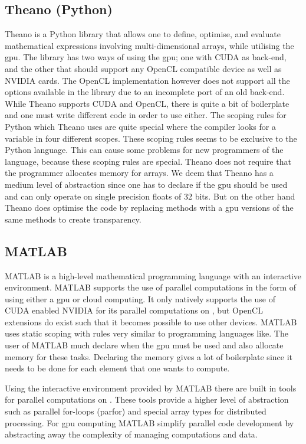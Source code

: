 \subsection{Theano (Python)}
Theano is a Python library that allows one to define, optimise, and evaluate mathematical expressions involving multi-dimensional arrays, while utilising the \acrshort{gpu}.
The library has two ways of using the \acrshort{gpu}; one with CUDA as back-end, and the other that should support any OpenCL compatible device as well as NVIDIA cards.
The OpenCL implementation however does not support all the options available in the library due to an incomplete port of an old back-end.
While Theano supports CUDA and OpenCL, there is quite a bit of boilerplate and one must write different code in order to use either.	
The scoping rules for Python which Theano uses are quite special where the compiler looks for a variable in four different scopes.
These scoping rules seems to be exclusive to the Python language.
This can cause some problems for new programmers of the language, because these scoping rules are special.
 Theano does not require that the programmer allocates memory for arrays.
We deem that Theano has a medium level of abstraction since one has to declare if the \acrshort{gpu} should be used and can only operate on single precision floats of 32 bits.
But on the other hand Theano does optimise the code by replacing methods with a \acrshort{gpu} versions of the same methods to create transparency. \citep{Theano,Theano_GPU,bergstratheano, LEGB}

\subsection{MATLAB}
MATLAB is a high-level mathematical programming language with an interactive environment.
MATLAB supports the use of parallel computations in the form of using either a \acrshort{gpu} or cloud computing.
It only natively supports the use of CUDA enabled NVIDIA  for its parallel computations on , but OpenCL extensions do exist such that it becomes possible to use other devices.
MATLAB uses static scoping  with rules very similar to programming languages like.
The user of MATLAB much declare when the \acrshort{gpu} must be used and also allocate memory for these tasks.
Declaring the memory gives a lot of boilerplate since it needs to be done for each element that one wants to compute. \citep{MATLAB_backend,MATLAB_benchmark}

Using the interactive environment provided by MATLAB there are built in tools for parallel computations on .
These tools provide a higher level of abstraction such as parallel for-loops (parfor) and special array types for distributed processing.
For \acrshort{gpu} computing MATLAB simplify parallel code development by abstracting away the complexity of managing computations and data. \citep{MATLAB_parallel}

